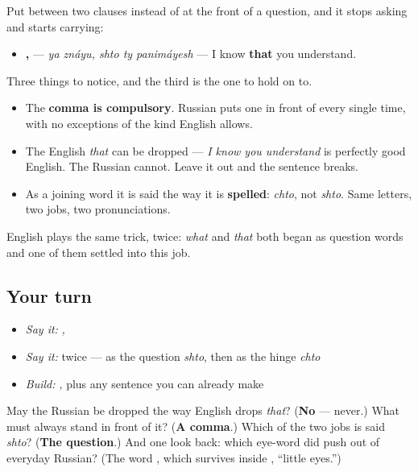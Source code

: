 \begin{grammarlens}[title={Grammar lens — the same word, doing the other job}]
Put \textbf{} between two clauses instead of at the front of a question, and it stops asking and starts carrying:

\begin{itemize}
\raggedright
  \item \textbf{ ,   } — \emph{ya znáyu, shto ty panimáyesh} — I know \textbf{that} you understand.
\end{itemize}

Three things to notice, and the third is the one to hold on to.

\begin{itemize}
\raggedright
  \item The \textbf{comma is compulsory}. Russian puts one in front of \textbf{} every single time, with no exceptions of the kind English allows.
  \item The English \emph{that} can be dropped — \emph{I know you understand} is perfectly good English. The Russian \textbf{} cannot. Leave it out and the sentence breaks.
  \item As a joining word it is said the way it is \textbf{spelled}: \emph{chto}, not \emph{shto}. Same letters, two jobs, two pronunciations.
\end{itemize}

English plays the same trick, twice: \emph{what} and \emph{that} both began as question words and one of them settled into this job.
\end{grammarlens}

\subsection*{Your turn}
\begin{itemize}
\raggedright
  \item \emph{Say it:} \emph{ ,   }
  \item \emph{Say it:} \emph{} twice — as the question \emph{shto}, then as the hinge \emph{chto}
  \item \emph{Build:} \emph{ , } plus any sentence you can already make
\end{itemize}

\begin{tcolorbox}[breakable,colback=teal!4,colframe=teal!35!black,title={Before you move on}]
May the Russian \textbf{} be dropped the way English drops \emph{that}? (\textbf{No} — never.) What must always stand in front of it? (\textbf{A comma}.) Which of the two jobs is said \emph{shto}? (\textbf{The question}.) And one look back: which eye-word did \emph{} push out of everyday Russian? (The word \textbf{}, which survives inside \emph{}, \textquotedblleft{}little eyes.\textquotedblright{})
\end{tcolorbox}

